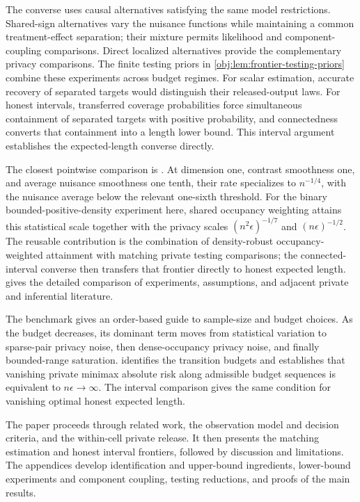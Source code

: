 The converse uses causal alternatives satisfying the same model restrictions. Shared-sign alternatives vary the nuisance functions while maintaining a common treatment-effect separation; their mixture permits likelihood and component-coupling comparisons. Direct localized alternatives provide the complementary privacy comparisons. The finite testing priors in \cref{obj:lem:frontier-testing-priors} combine these experiments across budget regimes. For scalar estimation, accurate recovery of separated targets would distinguish their released-output laws. For honest intervals, transferred coverage probabilities force simultaneous containment of separated targets with positive probability, and connectedness converts that containment into a length lower bound. This interval argument establishes the expected-length converse directly.

The closest pointwise comparison is \citet[][Theorems 1--2 and Remarks 2 and 11]{KennedyBalakrishnanRobinsWasserman2024}. At dimension one, contrast smoothness one, and average nuisance smoothness one tenth, their rate specializes to \(n^{-1/4}\), with the nuisance average below the relevant one-sixth threshold. For the binary bounded-positive-density experiment here, shared occupancy weighting attains this statistical scale together with the privacy scales \((n^2\epsilon)^{-1/7}\) and \((n\epsilon)^{-1/2}\). The reusable contribution is the combination of density-robust occupancy-weighted attainment with matching private testing comparisons; the connected-interval converse then transfers that frontier directly to honest expected length.  gives the detailed comparison of experiments, assumptions, and adjacent private and inferential literature.

The benchmark gives an order-based guide to sample-size and budget choices. As the budget decreases, its dominant term moves from statistical variation to sparse-pair privacy noise, then dense-occupancy privacy noise, and finally bounded-range saturation.  identifies the transition budgets and establishes that vanishing private minimax absolute risk along admissible budget sequences is equivalent to \(n\epsilon\to\infty\). The interval comparison gives the same condition for vanishing optimal honest expected length.



The paper proceeds through related work, the observation model and decision criteria, and the within-cell private release. It then presents the matching estimation and honest interval frontiers, followed by discussion and limitations. The appendices develop identification and upper-bound ingredients, lower-bound experiments and component coupling, testing reductions, and proofs of the main results.
